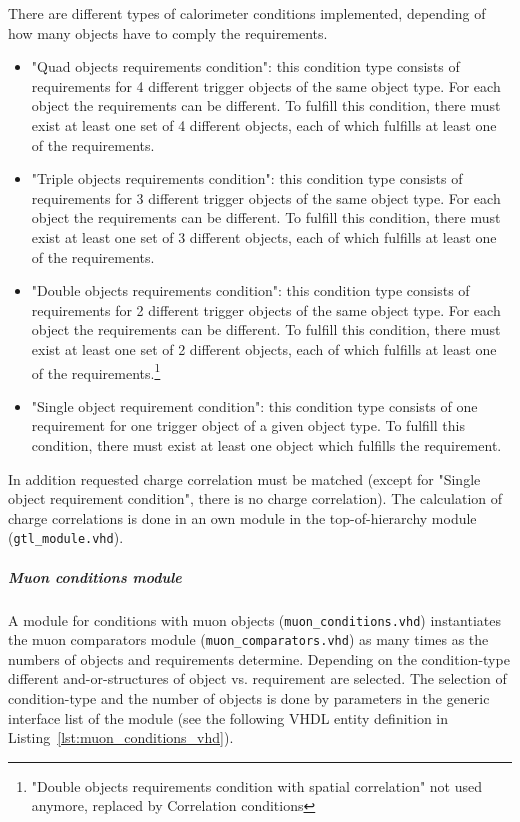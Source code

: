 There are different types of calorimeter conditions implemented, depending of how many objects have to comply the requirements.
\begin{itemize}
\item "Quad objects requirements condition": this condition type consists of requirements for 4 different trigger objects of the same object type. 
For each object the requirements can be different. To fulfill this condition, there must exist at least one set of 4 different objects,
each of which fulfills at least one of the requirements.
\item "Triple objects requirements condition": this condition type consists of requirements for 3 different trigger objects of the same object type. 
For each object the requirements can be different. To fulfill this condition, there must exist at least one set of 3 different objects,
each of which fulfills at least one of the requirements.
\item "Double objects requirements condition": this condition type consists of requirements for 2 different trigger objects of the same object type. 
For each object the requirements can be different. To fulfill this condition, there must exist at least one set of 2 different objects,
each of which fulfills at least one of the requirements.\footnote{"Double objects requirements condition with spatial correlation" not used anymore, replaced by Correlation conditions}
\item "Single object requirement condition": this condition type consists of one requirement for one trigger object of a given object type. 
To fulfill this condition, there must exist at least one object which fulfills the requirement.

\end{itemize}

In addition requested charge correlation must be matched (except for "Single object requirement condition", there is no charge correlation).
The calculation of charge correlations is done in an own module in the top-of-hierarchy module (\texttt{gtl\_module.vhd}).\\

\subparagraph{Muon conditions module}
A module for conditions with muon objects (\texttt{muon\_conditions.vhd}) instantiates the muon comparators module (\texttt{muon\_comparators.vhd}) as many times as
the numbers of objects and requirements determine. Depending on the condition-type different and-or-structures of object vs. requirement are selected.
The selection of condition-type and the number of objects is done by parameters in the generic interface list of the module
(see the following VHDL entity definition in Listing~\ref{lst:muon_conditions_vhd}).\\


